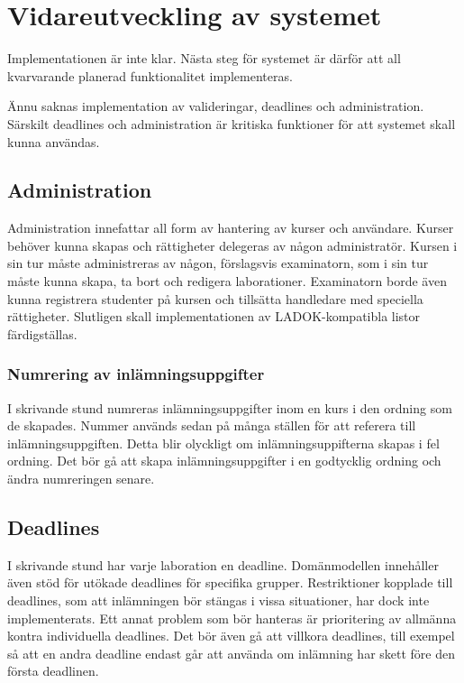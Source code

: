 \section{Vidareutveckling av systemet}

Implementationen är inte klar. Nästa steg för systemet är därför att all kvarvarande planerad funktionalitet implementeras.

Ännu saknas implementation av valideringar, deadlines och administration. Särskilt deadlines och administration är kritiska funktioner för att systemet skall kunna användas. 

\subsection{Administration}

Administration innefattar all form av hantering av kurser och användare. Kurser behöver kunna skapas och rättigheter delegeras av någon administratör. Kursen i sin tur måste administreras av någon, förslagsvis examinatorn, som i sin tur måste kunna skapa, ta bort och redigera laborationer. Examinatorn borde även kunna registrera studenter på kursen och tillsätta handledare med speciella rättigheter. Slutligen skall implementationen av LADOK-kompatibla listor färdigställas.

\subsubsection{Numrering av inlämningsuppgifter}
I skrivande stund numreras inlämningsuppgifter inom en kurs i den ordning som de skapades. Nummer används sedan på många ställen för att referera till inlämningsuppgiften. Detta blir olyckligt om inlämningsuppifterna skapas i fel ordning. Det bör gå att skapa inlämningsuppgifter i en godtycklig ordning och ändra numreringen senare.

\subsection{Deadlines}
I skrivande stund har varje laboration en deadline. Domänmodellen innehåller även stöd för utökade deadlines för specifika grupper. Restriktioner kopplade till deadlines, som att inlämningen bör stängas i vissa situationer, har dock inte implementerats. Ett annat problem som bör hanteras är prioritering av allmänna kontra individuella deadlines. Det bör även gå att villkora deadlines, till exempel så att en andra deadline endast går att använda om inlämning har skett före den första deadlinen.

